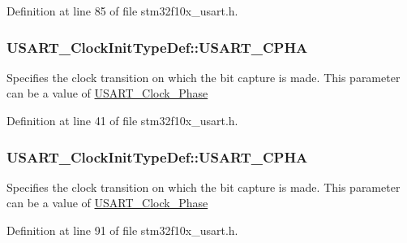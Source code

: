 Definition at line 85 of file stm32f10x\+\_\+usart.\+h.

\subsubsection[{\texorpdfstring{U\+S\+A\+R\+T\+\_\+\+C\+P\+HA}{USART_CPHA}}]{ U\+S\+A\+R\+T\+\_\+\+Clock\+Init\+Type\+Def\+::\+U\+S\+A\+R\+T\+\_\+\+C\+P\+HA}\hypertarget{struct_u_s_a_r_t___clock_init_type_def_a0aaf7f45ceb123898a63c476aa9cc7f3}{}\label{struct_u_s_a_r_t___clock_init_type_def_a0aaf7f45ceb123898a63c476aa9cc7f3}
Specifies the clock transition on which the bit capture is made. This parameter can be a value of \hyperlink{group___u_s_a_r_t___clock___phase}{U\+S\+A\+R\+T\+\_\+\+Clock\+\_\+\+Phase} 

Definition at line 41 of file stm32f10x\+\_\+usart.\+h.

\subsubsection[{\texorpdfstring{U\+S\+A\+R\+T\+\_\+\+C\+P\+HA}{USART_CPHA}}]{ U\+S\+A\+R\+T\+\_\+\+Clock\+Init\+Type\+Def\+::\+U\+S\+A\+R\+T\+\_\+\+C\+P\+HA}\hypertarget{struct_u_s_a_r_t___clock_init_type_def_abda3a2172bd5819e1c207dc0d1c822d8}{}\label{struct_u_s_a_r_t___clock_init_type_def_abda3a2172bd5819e1c207dc0d1c822d8}
Specifies the clock transition on which the bit capture is made. This parameter can be a value of \hyperlink{group___u_s_a_r_t___clock___phase}{U\+S\+A\+R\+T\+\_\+\+Clock\+\_\+\+Phase} 

Definition at line 91 of file stm32f10x\+\_\+usart.\+h.

